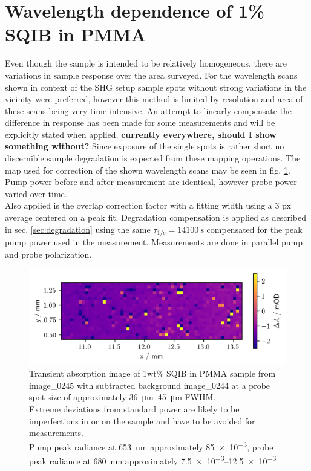 \documentclass[twoside,openright]{scrreprt}
\begin{document}
\section{Wavelength dependence of 1\% SQIB in PMMA}


Even though the sample is intended to be relatively homogeneous, there are variations in sample response over the area surveyed. For the wavelength scans shown in context of the SHG setup sample spots without strong variations in the vicinity were preferred, however this method is limited by resolution and area of these scans being very time intensive. An attempt to linearly compensate the difference in response has been made for some measurements and will be explicitly stated when applied. \textbf{currently everywhere, should I show something without?} Since exposure of the single spots is rather short no discernible sample degradation is expected from these mapping operations. The map used for correction of the shown wavelength scans may be seen in fig. \ref{fig:TA_image_sample}. Pump power before and after measurement are identical, however probe power varied over time.\\
Also applied is the overlap correction factor with a fitting width using a 3 px average centered on a peak fit. Degradation compensation is applied as described in sec. \ref{sec:degradation} using the same $\tau_{1/e} = \SI{14100}{\second}$ compensated for the peak pump power used in the measurement.
Measurements are done in parallel pump and probe polarization.

\begin{figure}[hbt]
\centering
\includegraphics[scale=1]{images/1percentSQIBinPMMA_Sample653-680Image.png}
\caption{Transient absorption image of 1wt\% SQIB in PMMA sample from image\_0245 with subtracted background image\_0244 at a probe spot size of approximately \SIrange{36}{45}{\micro\meter} FWHM.\\ Extreme deviations from standard power are likely to be imperfections in or on the sample and have to be avoided for measurements.\\ Pump peak radiance at \SI{653}{\nano\meter} approximately \SI{85e-3}{\radExp}, probe peak radiance at \SI{680}{\nano\meter} approximately \SIrange{7.5e-3}{12.5e-3}{\radExp}\label{fig:TA_image_sample}}
\end{figure}
\end{document}
